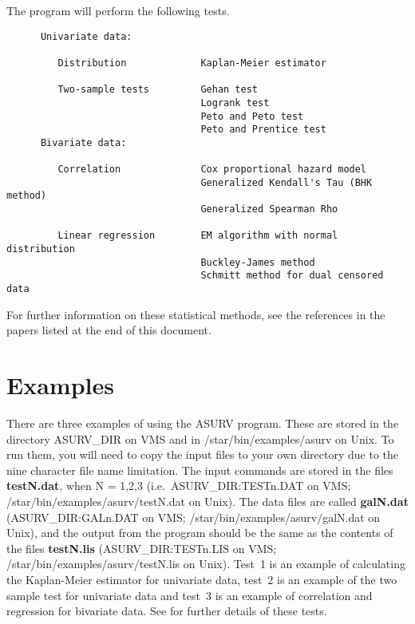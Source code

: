 The program will perform the following tests.
\begin{small}
\begin{verbatim}
      Univariate data:

         Distribution             Kaplan-Meier estimator

         Two-sample tests         Gehan test
                                  Logrank test
                                  Peto and Peto test
                                  Peto and Prentice test
      Bivariate data:

         Correlation              Cox proportional hazard model
                                  Generalized Kendall's Tau (BHK method)
                                  Generalized Spearman Rho

         Linear regression        EM algorithm with normal distribution
                                  Buckley-James method
                                  Schmitt method for dual censored data
\end{verbatim}
\end{small}

For further information on these statistical methods, see the references in the
papers listed at the end of this document.

\section{Examples}

There are three examples of using the ASURV program. These are stored in the
directory ASURV\_DIR on VMS and in /star\-/bin\-/examples\-/asurv on Unix. To
run them, you will need to copy the input files to your own directory due to
the nine character file name limitation. The input commands are stored in the
files {\bf testN.dat}, when N = 1,2,3 (i.e.\ ASURV\_DIR:\-TESTn.DAT on VMS;
/star\-/bin\-/examples\-/asurv\-/testN.dat on Unix). The data files are called
{\bf galN.dat} (ASURV\_DIR:\-GALn.DAT on VMS;
/star\-/bin\-/examples\-/asurv\-/galN.dat on Unix), and the output from the
program should be the same as the contents of the files {\bf testN.lis}
(ASURV\_DIR:\-TESTn.LIS on VMS; /star\-/bin\-/examples\-/asurv\-/testN.lis on
Unix). Test~1 is an example of calculating the Kaplan-Meier estimator for
univariate data, test~2 is an example of the two sample test for univariate
data and test~3 is an example of correlation and regression for bivariate data.
See \cite{mud-1} for further details of these tests.

